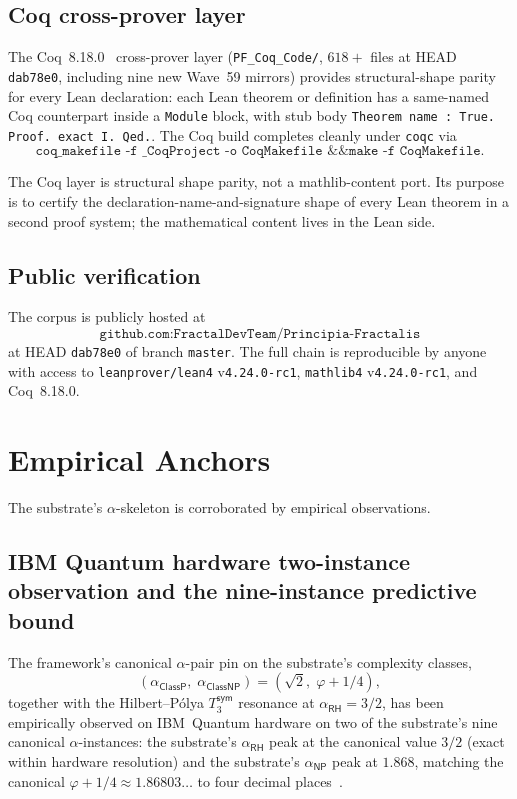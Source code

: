 \documentclass[11pt,a4paper]{amsart}
\theoremstyle{plain}
\theoremstyle{definition}
\begin{document}
\subsection{Coq cross-prover layer}

The Coq~8.18.0~\cite{barras-bertot2009} cross-prover layer (\texttt{PF\_Coq\_Code/}, $618{+}$ files at HEAD \texttt{dab78e0}, including nine new Wave~59 mirrors) provides structural-shape parity for every Lean declaration: each Lean theorem or definition has a same-named Coq counterpart inside a \texttt{Module} block, with stub body \texttt{Theorem name : True. Proof. exact I. Qed.}. The Coq build completes cleanly under \texttt{coqc} via
\[
\texttt{coq\_makefile -f \_CoqProject -o CoqMakefile \&\& make -f CoqMakefile}.
\]

The Coq layer is structural shape parity, not a mathlib-content port. Its purpose is to certify the declaration-name-and-signature shape of every Lean theorem in a second proof system; the mathematical content lives in the Lean side.

\subsection{Public verification}

The corpus is publicly hosted at
\[
\texttt{github.com:FractalDevTeam/Principia-Fractalis}
\]
at HEAD \texttt{dab78e0} of branch \texttt{master}. The full chain is reproducible by anyone with access to \texttt{leanprover/lean4} v\texttt{4.24.0-rc1}, \texttt{mathlib4} v\texttt{4.24.0-rc1}, and Coq~8.18.0.

\section{Empirical Anchors}\label{sec:empirical}

The substrate's $\alpha$-skeleton is corroborated by empirical observations.

\subsection{IBM Quantum hardware two-instance observation and the nine-instance predictive bound}

The framework's canonical $\alpha$-pair pin on the substrate's complexity classes,
\[
(\alpha_{\textsf{ClassP}},\;\alpha_{\textsf{ClassNP}}) = (\sqrt{2},\;\varphi+1/4),
\]
together with the Hilbert--P\'olya $T_3^{\textsf{sym}}$ resonance at $\alpha_{\textsf{RH}}=3/2$, has been empirically observed on IBM~Quantum hardware on two of the substrate's nine canonical $\alpha$-instances: the substrate's $\alpha_{\textsf{RH}}$ peak at the canonical value $3/2$ (exact within hardware resolution) and the substrate's $\alpha_{\textsf{NP}}$ peak at $1.868$, matching the canonical $\varphi + 1/4 \approx 1.86803\ldots$ to four decimal places~\cite{cohen2026book,cohen2026substrate}.
\end{document}
